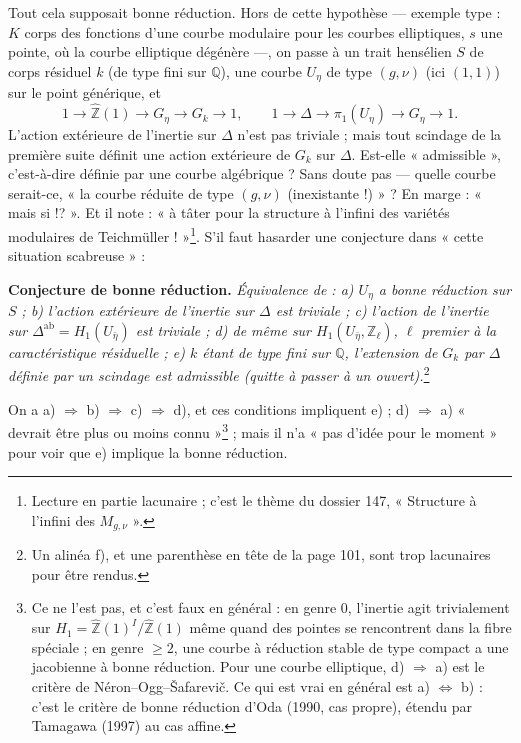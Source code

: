 \documentclass[11pt,a4paper]{article}
\begin{document}
Tout cela supposait bonne réduction. Hors de cette hypothèse — exemple type :
$K$ corps des fonctions d'une courbe modulaire pour les courbes elliptiques,
$s$ une pointe, où la courbe elliptique dégénère —, on passe à un trait
hensélien $S$ de corps résiduel $k$ (de type fini sur $\mathbb{Q}$), une courbe
$U_\eta$ de type $(g, \nu)$ (ici $(1,1)$) sur le point générique, et
\[
1 \to \widehat{\mathbb{Z}}(1) \to G_\eta \to G_k \to 1, \qquad 1 \to \Delta \to
\pi_1(U_\eta) \to G_\eta \to 1 .
\]
L'action extérieure de l'inertie sur $\Delta$ n'est pas triviale ; mais tout
scindage de la première suite définit une action extérieure de $G_k$ sur
$\Delta$. Est-elle « admissible », c'est-à-dire définie par une courbe
algébrique ? Sans doute pas — quelle courbe serait-ce, « la courbe réduite de
type $(g, \nu)$ (inexistante !) » ? En marge : « mais si !? ». Et il
note : « à tâter pour la structure à l'infini des variétés modulaires de
Teichmüller ! »\footnote{Lecture en partie lacunaire ; c'est le thème du
dossier 147, « Structure à l'infini des $M_{g,\nu}$ ».}. S'il faut hasarder une
conjecture dans « cette situation scabreuse » :

\textbf{Conjecture de bonne réduction.} \emph{Équivalence de : a) $U_\eta$ a
bonne réduction sur $S$ ; b) l'action extérieure de l'inertie sur $\Delta$ est
triviale ; c) l'action de l'inertie sur $\Delta^{\mathrm{ab}} =
H_1(U_{\bar\eta})$ est triviale ; d) de même sur $H_1(U_{\bar\eta},
\mathbb{Z}_\ell)$, $\ell$ premier à la caractéristique résiduelle ; e) $k$ étant
de type fini sur $\mathbb{Q}$, l'extension de $G_k$ par $\Delta$ définie par un
scindage est admissible (quitte à passer à un ouvert).}\footnote{Un alinéa f),
et une parenthèse en tête de la page 101, sont trop lacunaires pour être
rendus.}

On a a) $\Rightarrow$ b) $\Rightarrow$ c) $\Rightarrow$ d), et ces
conditions impliquent e) ; d) $\Rightarrow$ a) « devrait être plus ou moins
connu »\footnote{Ce ne l'est pas, et c'est faux en général : en genre $0$,
l'inertie agit trivialement sur $H_1 = \widehat{\mathbb{Z}}(1)^I /
\widehat{\mathbb{Z}}(1)$ même quand des pointes se rencontrent dans la fibre
spéciale ; en genre $\ge 2$, une courbe à réduction stable de type compact a une
jacobienne à bonne réduction. Pour une courbe elliptique, d) $\Rightarrow$ a)
est le critère de Néron–Ogg–Šafarevič. Ce qui est vrai en général est a)
$\Leftrightarrow$ b) : c'est le critère de bonne réduction d'Oda (1990, cas
propre), étendu par Tamagawa (1997) au cas affine.} ; mais il n'a « pas d'idée
pour le moment » pour voir que e) implique la bonne réduction.
\end{document}
